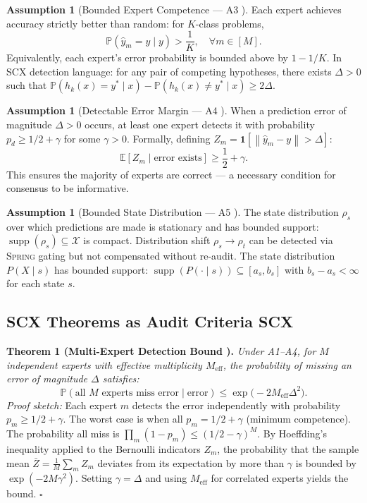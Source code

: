 \documentclass[12pt,a4paper]{article}
\theoremstyle{definition}
\newtheorem{assumption}[theorem]{Assumption}
\newcommand{\Spring}{\textsc{Spring}}
\newcommand{\SCX}{\textsc{SCX}}
\DeclareMathOperator{\supp}{supp}
\newcommand{\E}{\mathbb{E}}
\newcommand{\Pbb}{\mathbb{P}}
\newcommand{\cX}{\mathcal{X}}
\newcommand{\ind}[1]{\mathbf{1}[#1]}
\newcommand{\norm}[1]{\left\lVert#1\right\rVert}
\begin{document}
\begin{assumption}[Bounded Expert Competence — A3 ]
\label{asm:A3}
Each expert achieves accuracy strictly better than random: for $K$-class problems,
\[
\Pbb(\hat{y}_m = y \mid y) > \frac{1}{K}, \quad \forall m \in [M].
\]
Equivalently, each expert's error probability is bounded above by $1 - 1/K$. In \SCX{} detection language: for any pair of competing hypotheses, there exists $\Delta > 0$ such that $\Pbb(h_k(x) = y^* \mid x) - \Pbb(h_k(x) \neq y^* \mid x) \ge 2\Delta$.
\end{assumption}

\begin{assumption}[Detectable Error Margin — A4 ]
\label{asm:A4}
When a prediction error of magnitude $\Delta > 0$ occurs, at least one expert detects it with probability $p_d \ge 1/2 + \gamma$ for some $\gamma > 0$. Formally, defining $Z_m = \ind{\norm{\hat{y}_m - y} > \Delta}$:
\[
\E[Z_m \mid \text{error exists}] \ge \frac{1}{2} + \gamma.
\]
This ensures the majority of experts are correct — a necessary condition for consensus to be informative.
\end{assumption}

\begin{assumption}[Bounded State Distribution — A5 ]
\label{asm:A5}
The state distribution $\rho_s$ over which predictions are made is stationary and has bounded support: $\supp(\rho_s) \subseteq \cX$ is compact. Distribution shift $\rho_s \to \rho_t$ can be detected via \Spring{} gating but not compensated without re-audit. The state distribution $P(X \mid s)$ has bounded support: $\supp(P(\cdot \mid s)) \subseteq [a_s, b_s]$ with $b_s - a_s < \infty$ for each state $s$.
\end{assumption}

\subsection{SCX Theorems as Audit Criteria SCX}

\noindent\textbf{Theorem 1 (Multi-Expert Detection Bound ).} \textit{Under A1--A4, for $M$ independent experts with effective multiplicity $M_{\text{eff}}$, the probability of missing an error of magnitude $\Delta$ satisfies:}
\begin{equation}\label{eq:thm1}
    \Pbb(\text{all } M \text{ experts miss error} \mid \text{error}) \le \exp\bigl(-2 M_{\text{eff}} \Delta^2\bigr).
\end{equation}
\textit{Proof sketch:} Each expert $m$ detects the error independently with probability $p_m \ge 1/2 + \gamma$. The worst case is when all $p_m = 1/2 + \gamma$ (minimum competence). The probability all miss is $\prod_m (1 - p_m) \le (1/2 - \gamma)^M$. By Hoeffding's inequality applied to the Bernoulli indicators $Z_m$, the probability that the sample mean $\bar{Z} = \frac{1}{M}\sum_m Z_m$ deviates from its expectation by more than $\gamma$ is bounded by $\exp(-2M\gamma^2)$. Setting $\gamma = \Delta$ and using $M_{\text{eff}}$ for correlated experts yields the bound. \hfill $\square$
\end{document}

